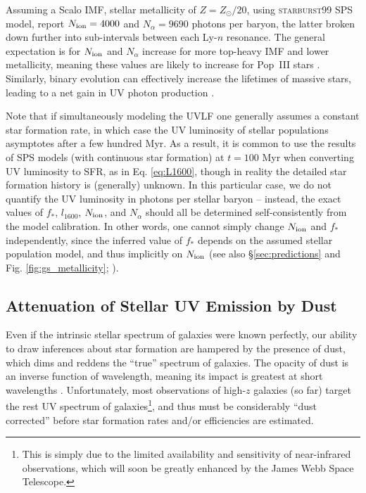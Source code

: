 Assuming a Scalo IMF, stellar metallicity of $Z=Z_{\odot}/20$, using \textsc{starburst99} SPS model, \cite{Barkana2005} report $N_{\text{ion}}=4000$ and $N_{\alpha}=9690$ photons per baryon, the latter broken down further into sub-intervals between each Ly-$n$ resonance. The general expectation is for $N_{\text{ion}}$ and $N_{\alpha}$ increase for more top-heavy IMF and lower metallicity, meaning these values are likely to increase for Pop~III stars \cite{Bromm2001,Tumlinson2000,Schaerer2002}. Similarly, binary evolution can effectively increase the lifetimes of massive stars, leading to a net gain in UV photon production \cite{Stanway2016}.

Note that if simultaneously modeling the UVLF one generally assumes a constant star formation rate, in which case the UV luminosity of stellar populations asymptotes after a few hundred Myr. As a result, it is common to use the results of SPS models (with continuous star formation) at $t=100$ Myr when converting UV luminosity to SFR, as in Eq. \ref{eq:L1600}, though in reality the detailed star formation history is (generally) unknown. In this particular case, we do not quantify the UV luminosity in photons per stellar baryon -- instead, the exact values of $f_{\ast}$, $l_{1600}$, $N_{\text{ion}}$, and $N_{\alpha}$ should all be determined self-consistently from the model calibration. In other words, one cannot simply change $N_{\text{ion}}$ and $f_{\ast}$ independently, since the inferred value of $f_{\ast}$ depends on the assumed stellar population model, and thus implicitly on $N_{\text{ion}}$ (see also \S\ref{sec:predictions} and Fig.  \ref{fig:gs_metallicity}; \cite{Mirocha2017}).


\subsection{Attenuation of Stellar UV Emission by Dust} \label{sec:dust}
Even if the intrinsic stellar spectrum of galaxies were known perfectly, our ability to draw inferences about star formation are hampered by the presence of dust, which dims and reddens the ``true'' spectrum of galaxies. The opacity of dust is an inverse function of wavelength, meaning its impact is greatest at short wavelengths \cite{Weingartner2001}. Unfortunately, most observations of high-$z$ galaxies (so far) target the rest UV spectrum of galaxies\footnote{This is simply due to the limited availability and sensitivity of near-infrared observations, which will soon be greatly enhanced by the James Webb Space Telescope.}, and thus must be considerably ``dust corrected'' before star formation rates and/or efficiencies are estimated. 


